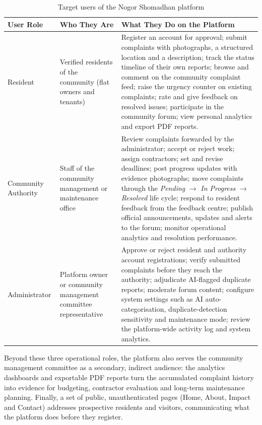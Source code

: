 \documentclass[11pt,a4paper]{article}
\begin{document}
\begin{table}[htbp]
\centering
\caption{Target users of the Nogor Shomadhan platform}
\label{tab:target-users}
\renewcommand{\arraystretch}{1.25}
\begin{tabularx}{\textwidth}{L{2.6cm} L{3.4cm} X}
\toprule
\textbf{User Role} & \textbf{Who They Are} & \textbf{What They Do on the Platform} \\
\midrule
Resident &
Verified residents of the community (flat owners and tenants) &
Register an account for approval; submit complaints with photographs, a
structured location and a description; track the status timeline of their own
reports; browse and comment on the community complaint feed; raise the urgency
counter on existing complaints; rate and give feedback on resolved issues;
participate in the community forum; view personal analytics and export PDF
reports. \\
\addlinespace
Community Authority &
Staff of the community management or maintenance office &
Review complaints forwarded by the administrator; accept or reject work; assign
contractors; set and revise deadlines; post progress updates with evidence
photographs; move complaints through the \emph{Pending} $\rightarrow$
\emph{In Progress} $\rightarrow$ \emph{Resolved} life cycle; respond to resident
feedback from the feedback centre; publish official announcements, updates and
alerts to the forum; monitor operational analytics and resolution performance. \\
\addlinespace
Administrator &
Platform owner or community management committee representative &
Approve or reject resident and authority account registrations; verify submitted
complaints before they reach the authority; adjudicate AI-flagged duplicate
reports; moderate forum content; configure system settings such as AI
auto-categorisation, duplicate-detection sensitivity and maintenance mode; review
the platform-wide activity log and system analytics. \\
\bottomrule
\end{tabularx}
\end{table}

Beyond these three operational roles, the platform also serves the community
management committee as a secondary, indirect audience: the analytics dashboards
and exportable PDF reports turn the accumulated complaint history into evidence
for budgeting, contractor evaluation and long-term maintenance planning. Finally,
a set of public, unauthenticated pages (Home, About, Impact and Contact)
addresses prospective residents and visitors, communicating what the platform
does before they register.
\end{document}
